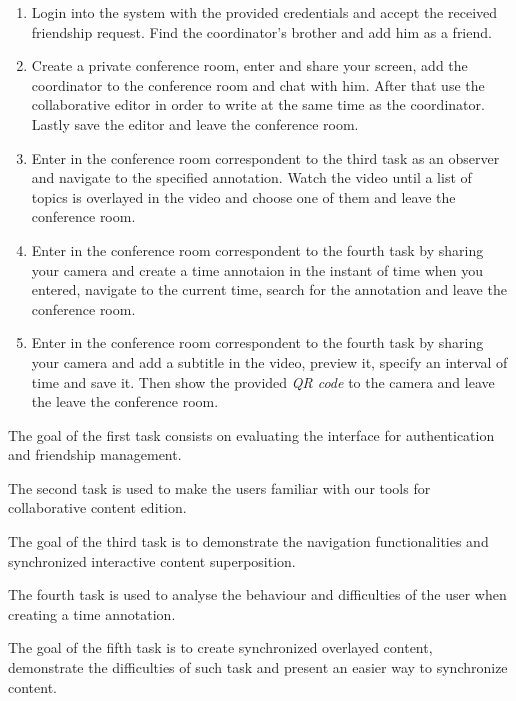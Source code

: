       \begin{enumerate}
      \item Login into the system with the provided credentials and accept the received friendship request. Find the coordinator's brother and add him as a friend.

      \item Create a private conference room, enter and share your screen, add the coordinator to the conference room and chat with him. After that use the collaborative editor in order to write at the same time as the coordinator. Lastly save the editor and leave the conference room.

      \item Enter in the conference room correspondent to the third task as an observer and navigate to the specified annotation. Watch the video until a list of topics is overlayed in the video and choose one of them and leave the conference room.

      \item Enter in the conference room correspondent to the fourth task by sharing your camera and create a time annotaion in the instant of time when you entered, navigate to the current time, search for the annotation and leave the conference room.

      \item Enter in the conference room correspondent to the fourth task by sharing your camera and add a subtitle in the video, preview it, specify an interval of time and save it. Then show the provided \emph{QR code} to the camera and leave the leave the conference room.
      \end{enumerate}

      The goal of the first task consists on evaluating the interface for authentication and friendship management.

      The second task is used to make the users familiar with our tools for collaborative content edition.

      The goal of the third task is to demonstrate the navigation functionalities and synchronized interactive content superposition.

      The fourth task is used to analyse the behaviour and difficulties of the user when creating a time annotation.

      The goal of the fifth task is to create synchronized overlayed content, demonstrate the difficulties of such task and present an easier way to synchronize content.


